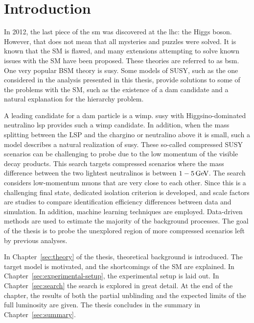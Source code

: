 \chapter{Introduction}

In 2012, the last piece of the \gls{sm} was discovered at the \gls{lhc}: the Higgs boson. However, that does not mean that all mysteries and puzzles were solved. It is known that the SM is flawed, and many extensions attempting to solve known issues with the SM have been proposed. These theories are referred to as \gls{bsm}. One very popular BSM theory is \gls{susy}. Some models of SUSY, such as the one considered in the analysis presented in this thesis, provide solutions to some of the problems with the SM, such as the existence of a \gls{dam} candidate and a natural explanation for the hierarchy problem.

A leading candidate for a \gls{dam} particle is a \gls{wimp}. \gls{susy} with Higgsino-dominated neutralino \gls{lsp} provides such a \gls{wimp} candidate. In addition, when the mass splitting between the LSP and the chargino or neutralino above it is small, such a model describes a natural realization of \gls{susy}. These so-called compressed SUSY scenarios can be challenging to probe due to the low momentum of the visible decay products. This search targets compressed scenarios where the mass difference between the two lightest neutralinos is between $1-5\,\text{Ge\hspace{-.08em}V}$. The search considers low-momentum muons that are very close to each other. Since this is a challenging final state, dedicated isolation criterion is developed, and scale factors are studies to compare identification efficiency differences between data and simulation. In addition, machine learning techniques are employed. Data-driven methods are used to estimate the majority of the background processes. The goal of the thesis is to probe the unexplored region of more compressed scenarios left by previous analyses.

In Chapter~\ref{sec:theory} of the thesis, theoretical background is introduced. The target model is motivated, and the shortcomings of the SM are explained. In Chapter~\ref{sec:experimental-setup}, the experimental setup is laid out. In Chapter~\ref{sec:search} the search is explored in great detail. At the end of the chapter, the results of both the partial unblinding and the expected limits of the full luminosity are given. The thesis concludes in the summary in Chapter~\ref{sec:summary}.